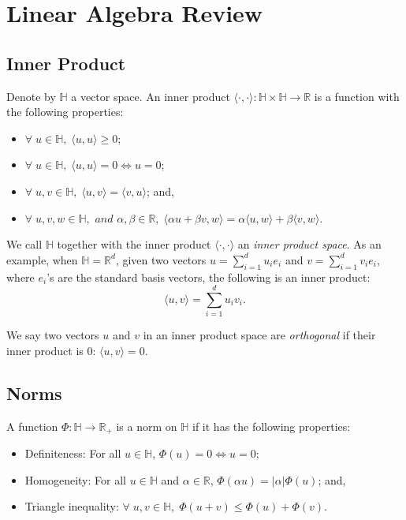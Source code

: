 \chapter{Linear Algebra Review}
\label{appendix:linear-algebra}


\section{Inner Product}

Denote by $\mathbb{H}$ a vector space.
An inner product $\langle \cdot, \cdot \rangle: \mathbb{H} \times \mathbb{H} \rightarrow \mathbb{R}$
is a function with the following properties:
\begin{itemize}
    \item $\forall \; u \in \mathbb{H},\; \langle u, u \rangle \geq 0$;
    \item $\forall \; u \in \mathbb{H},\; \langle u, u \rangle = 0 \Leftrightarrow u = 0$;
    \item $\forall \; u, v \in \mathbb{H},\; \langle u, v \rangle = \langle v, u \rangle$; and,
    \item $\forall \; u, v, w \in \mathbb{H}, \textit{ and } \alpha, \beta \in \mathbb{R},\; 
    \langle \alpha u + \beta v, w \rangle = \alpha \langle u, w \rangle + \beta \langle v, w \rangle$.
\end{itemize}

We call $\mathbb{H}$ together with the inner product $\langle \cdot, \cdot \rangle$
an \emph{inner product space}.
As an example, when $\mathbb{H} = \mathbb{R}^d$, given two vectors
$u = \sum_{i=1}^d u_i e_i$ and $v = \sum_{i=1}^d v_i e_i$, where $e_i$'s
are the standard basis vectors, the following is an inner product:
\begin{equation*}
    \langle u, v \rangle = \sum_{i = 1}^d u_i v_i.
\end{equation*}

We say two vectors $u$ and $v$ in an inner product space are \emph{orthogonal}
if their inner product is $0$: $\langle u, v \rangle = 0$.

\section{Norms}

A function $\Phi: \mathbb{H} \rightarrow \mathbb{R}_+$ is a norm on
$\mathbb{H}$ if it has the following properties:
\begin{itemize}
    \item Definiteness: For all $u \in \mathbb{H}$, $\Phi(u) = 0 \Leftrightarrow u = 0$;
    \item Homogeneity: For all $u \in \mathbb{H}$ and $\alpha \in \mathbb{R}$,
        $\Phi(\alpha u) = \lvert \alpha \rvert \Phi(u)$; and,
    \item Triangle inequality: $\forall \; u, v \in \mathbb{H}, \; \Phi(u + v) \leq \Phi(u) + \Phi(v)$.
\end{itemize}

